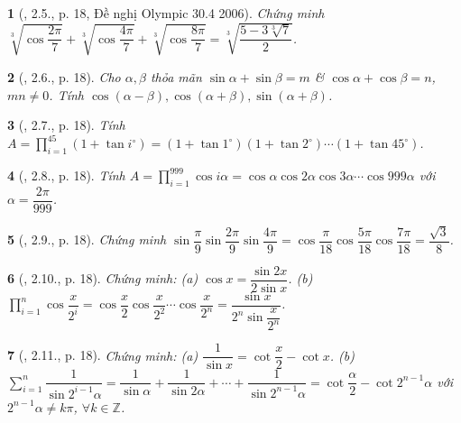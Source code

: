 \documentclass{article}
\newtheorem{baitoan}{}
\begin{document}
\begin{baitoan}[\cite{Hung_nang_cao_phat_trien_Toan_11_tap_1}, 2.5., p. 18, Đề nghị Olympic 30.4 2006]
	Chứng minh $\sqrt[3]{\cos\dfrac{2\pi}{7}} + \sqrt[3]{\cos\dfrac{4\pi}{7}} + \sqrt[3]{\cos\dfrac{8\pi}{7}} = \sqrt[3]{\dfrac{5 - 3\sqrt[3]{7}}{2}}$.
\end{baitoan}

\begin{baitoan}[\cite{Hung_nang_cao_phat_trien_Toan_11_tap_1}, 2.6., p. 18]
	Cho $\alpha,\beta$ thỏa mãn $\sin\alpha + \sin\beta= m$ \& $\cos\alpha + \cos\beta = n$, $mn\ne0$. Tính $\cos(\alpha - \beta),\cos(\alpha + \beta),\sin(\alpha + \beta)$.
\end{baitoan}

\begin{baitoan}[\cite{Hung_nang_cao_phat_trien_Toan_11_tap_1}, 2.7., p. 18]
	Tính $A = \prod_{i=1}^{45} (1 + \tan i^\circ) = (1 + \tan1^\circ)(1 + \tan2^\circ)\cdots(1 + \tan45^\circ)$.
\end{baitoan}

\begin{baitoan}[\cite{Hung_nang_cao_phat_trien_Toan_11_tap_1}, 2.8., p. 18]
	Tính $A = \prod_{i=1}^{999} \cos i\alpha = \cos\alpha\cos2\alpha\cos3\alpha\cdots\cos999\alpha$ với $\alpha = \dfrac{2\pi}{999}$. 
\end{baitoan}

\begin{baitoan}[\cite{Hung_nang_cao_phat_trien_Toan_11_tap_1}, 2.9., p. 18]
	Chứng minh $\sin\dfrac{\pi}{9}\sin\dfrac{2\pi}{9}\sin\dfrac{4\pi}{9} = \cos\dfrac{\pi}{18}\cos\dfrac{5\pi}{18}\cos\dfrac{7\pi}{18} = \dfrac{\sqrt{3}}{8}$.
\end{baitoan}

\begin{baitoan}[\cite{Hung_nang_cao_phat_trien_Toan_11_tap_1}, 2.10., p. 18]
	Chứng minh: (a) $\cos x = \dfrac{\sin2x}{2\sin x}$. (b) $\prod_{i=1}^n \cos\dfrac{x}{2^i} = \cos\dfrac{x}{2}\cos\dfrac{x}{2^2}\cdots\cos\dfrac{x}{2^n} = \dfrac{\sin x}{2^n\sin\dfrac{x}{2^n}}$.
\end{baitoan}

\begin{baitoan}[\cite{Hung_nang_cao_phat_trien_Toan_11_tap_1}, 2.11., p. 18]
	Chứng minh: (a) $\dfrac{1}{\sin x} = \cot\dfrac{x}{2} - \cot x$. (b) $\sum_{i=1}^n \dfrac{1}{\sin2^{i-1}\alpha} = \dfrac{1}{\sin\alpha} + \dfrac{1}{\sin2\alpha} + \cdots + \dfrac{1}{\sin2^{n-1}\alpha} = \cot\dfrac{\alpha}{2} - \cot2^{n-1}\alpha$ với $2^{n-1}\alpha\ne k\pi$, $\forall k\in\mathbb{Z}$.
\end{baitoan}
\end{document}
